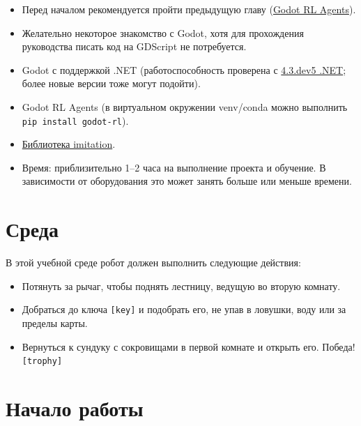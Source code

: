 \documentclass[11pt,a4paper]{article}
\begin{document}
\begin{itemize}
\tightlist
\item
  Перед началом рекомендуется пройти предыдущую главу (\href{https://huggingface.co/learn/deep-rl-course/unitbonus3/godotrl}{Godot RL Agents}).
\item
  Желательно некоторое знакомство с Godot, хотя для прохождения руководства писать код на GDScript не потребуется.
\item
  Godot с поддержкой .NET (работоспособность проверена с \href{https://godotengine.org/article/dev-snapshot-godot-4-3-dev-5/}{4.3.dev5 .NET}; более новые версии тоже могут подойти).
\item
  Godot RL Agents (в виртуальном окружении venv/conda можно выполнить \passthrough{\lstinline!pip install godot-rl!}).
\item
  \href{https://huggingface.co/learn/deep-rl-course/unitbonus5/train-our-robot}{Библиотека imitation}.
\item
  Время: приблизительно 1--2 часа на выполнение проекта и обучение. В зависимости от оборудования это может занять больше или меньше времени.
\end{itemize}

\section{Среда}\label{the-environment}


В этой учебной среде робот должен выполнить следующие действия:

\begin{itemize}
\tightlist
\item
  Потянуть за рычаг, чтобы поднять лестницу, ведущую во вторую комнату.
\item
  Добраться до ключа \texttt{[key]} и подобрать его, не упав в ловушки, воду или за пределы карты.
\item
  Вернуться к сундуку с сокровищами в первой комнате и открыть его. Победа! \texttt{[trophy]}
\end{itemize}

\section{Начало работы}\label{getting-started}
\end{document}
